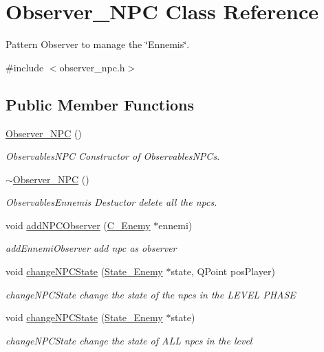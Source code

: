 \hypertarget{class_observer___n_p_c}{}\section{Observer\+\_\+\+N\+P\+C Class Reference}
\label{class_observer___n_p_c}


Pattern Observer to manage the \char`\"{}\+Ennemis\char`\"{}.  




{\ttfamily \#include $<$observer\+\_\+npc.\+h$>$}

\subsection*{Public Member Functions}
\begin{DoxyCompactItemize}
\item 
\hyperlink{class_observer___n_p_c_a02a4df6c3974a0ebae0143077fdc43b9}{Observer\+\_\+\+N\+P\+C} ()
\begin{DoxyCompactList}\small\item\em Observables\+N\+P\+C Constructor of Observables\+N\+P\+Cs. \end{DoxyCompactList}\item 
\hypertarget{class_observer___n_p_c_afa171d5bb3869a7a2a83024c9ee48c44}{}\hyperlink{class_observer___n_p_c_afa171d5bb3869a7a2a83024c9ee48c44}{$\sim$\+Observer\+\_\+\+N\+P\+C} ()\label{class_observer___n_p_c_afa171d5bb3869a7a2a83024c9ee48c44}

\begin{DoxyCompactList}\small\item\em Observables\+Ennemis Destuctor delete all the npcs. \end{DoxyCompactList}\item 
void \hyperlink{class_observer___n_p_c_ad19b7ebfa8ee3a222a330d9eb35ad464}{add\+N\+P\+C\+Observer} (\hyperlink{class_c___enemy}{C\+\_\+\+Enemy} $\ast$ennemi)
\begin{DoxyCompactList}\small\item\em add\+Ennemi\+Observer add npc as observer \end{DoxyCompactList}\item 
void \hyperlink{class_observer___n_p_c_a2c3cf6b1af26686ceedccf6f9007fb8a}{change\+N\+P\+C\+State} (\hyperlink{class_state___enemy}{State\+\_\+\+Enemy} $\ast$state, Q\+Point pos\+Player)
\begin{DoxyCompactList}\small\item\em change\+N\+P\+C\+State change the state of the npcs in the L\+E\+V\+E\+L P\+H\+A\+S\+E \end{DoxyCompactList}\item 
void \hyperlink{class_observer___n_p_c_ad00a8732a933b4ce78144993788b2a85}{change\+N\+P\+C\+State} (\hyperlink{class_state___enemy}{State\+\_\+\+Enemy} $\ast$state)
\begin{DoxyCompactList}\small\item\em change\+N\+P\+C\+State change the state of A\+L\+L npcs in the level \end{DoxyCompactList}\end{DoxyCompactItemize}


